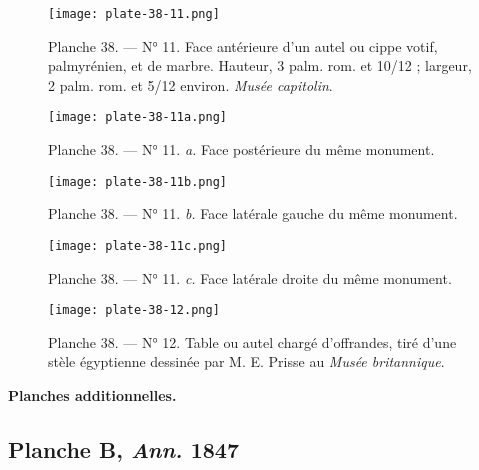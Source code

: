 \documentclass[a4paper, 11pt, oneside, polutonikogreek, french]{article}
\begin{document}
\vspace*{\fill}
\clearpage
\vspace*{\fill}
\begin{figure}[H]
\centering
\texttt{[image: plate-38-11.png]}
\caption{Planche 38. --- N° 11. Face antérieure d'un autel ou cippe votif, palmyrénien, et de marbre. Hauteur, 3 palm. rom. et 10/12 ; largeur, 2 palm. rom. et 5/12 environ. \emph{Musée capitolin}.}
\end{figure}
\vspace*{\fill}
\clearpage
\vspace*{\fill}
\begin{figure}[H]
\centering
\texttt{[image: plate-38-11a.png]}
\caption{Planche 38. --- N° 11. \emph{a.} Face postérieure du même monument.}
\end{figure}
\vspace*{\fill}
\clearpage
\vspace*{\fill}
\begin{figure}[H]
\centering
\texttt{[image: plate-38-11b.png]}
\caption{Planche 38. --- N° 11. \emph{b.} Face latérale gauche du même monument.}
\end{figure}
\vspace*{\fill}
\clearpage
\vspace*{\fill}
\begin{figure}[H]
\centering
\texttt{[image: plate-38-11c.png]}
\caption{Planche 38. --- N° 11. \emph{c.} Face latérale droite du même monument.}
\end{figure}
\vspace*{\fill}
\clearpage
\vspace*{\fill}
\begin{figure}[H]
\centering
\texttt{[image: plate-38-12.png]}
\caption{Planche 38. --- N° 12. Table ou autel chargé d'offrandes, tiré d'une stèle égyptienne dessinée par M. E. Prisse au \emph{Musée britannique}.}
\end{figure}
\vspace*{\fill}
\clearpage
\pagestyle{plain}
\vspace*{\fill}
\begin{center}
\textbf{Planches additionnelles.}
\end{center}
\subsection{Planche B, \emph{Ann.} 1847}
\end{document}
